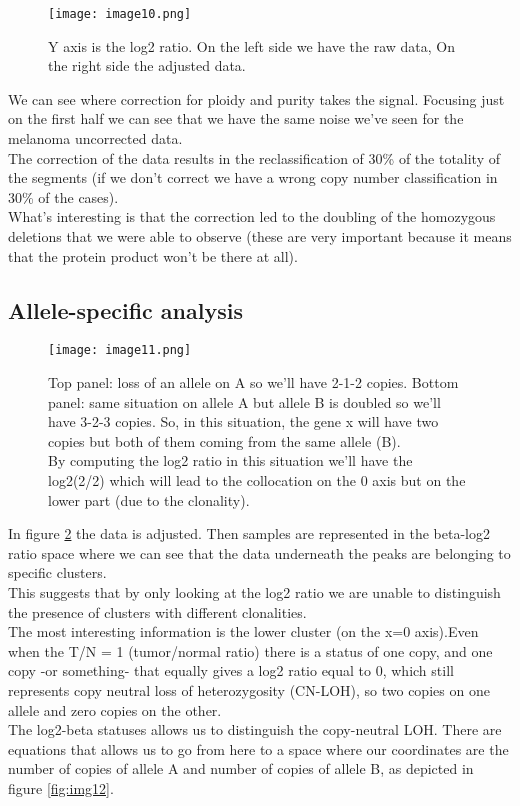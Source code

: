\begin{figure}[H]
\centering
\texttt{[image: image10.png]}
\caption{Y axis is the log2 ratio. On the left side we have the raw data, On the right side the adjusted data.}
\label{fig:ploidy_tcga}
\end{figure}

We can see where correction for ploidy and purity takes the signal. Focusing just on the first half we can see that we have the same noise we've seen for the melanoma uncorrected data.
\\
The correction of the data results in the reclassification of 30\% of the
totality of the segments (if we don't correct we have a wrong copy number
classification in 30\% of the cases).
\\
What's interesting is that the correction led to the doubling of the homozygous
deletions that we were able to observe (these are very important because it
means that the protein product won't be there at all).

\subsection{Allele-specific analysis}

\begin{figure}[H]
\centering
\texttt{[image: image11.png]}
\caption{Top panel: loss of an allele on A so we'll have 2-1-2 copies. Bottom panel: same situation on allele A but allele B is doubled so we'll have
3-2-3 copies. So, in this situation, the gene x will have two copies but both of them coming
from the same allele (B).
\\
By computing the log2 ratio in this situation we'll have the log2(2/2) which will lead to the collocation on the 0 axis but on the lower part (due to the clonality).}
\label{fig:img11}
\end{figure}

In figure \ref{fig:img11} the data is adjusted. Then samples are represented in the beta-log2 ratio space where we can see that the data underneath the peaks are belonging to specific clusters.
\\
This suggests that by only looking at the log2 ratio we are unable to distinguish the presence of clusters with different clonalities.
\\
The most interesting information is the lower cluster (on the x=0 axis).Even when the T/N = 1 (tumor/normal ratio) there is a status of one copy, and one copy -or something- that equally gives a log2 ratio equal to 0, which still represents copy neutral loss of heterozygosity (CN-LOH), so two copies on one allele and zero copies on the other.
\\
The log2-beta statuses allows us to distinguish the copy-neutral LOH. There are equations that allows us to go from here to a space where our coordinates are the number of copies of allele A and number of copies of allele B, as depicted in figure \ref{fig:img12}.

